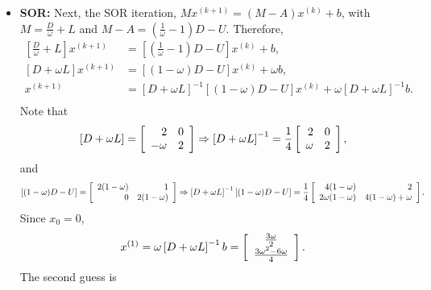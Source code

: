 \begin{questions}
\begin{solution}
\begin{itemize}
\item \textbf{SOR:}
Next, the SOR iteration, $Mx^{(k+1)}=\left(M-A\right)x^{(k)}+b$, with $M=\frac{D}{\omega}+L$ and $M-A=(\frac{1}{\omega}-1)D-U$. Therefore,
\begin{align*}
\left[\frac{D}{\omega}+L\right]x^{(k+1)}&=\left[\left(\frac{1}{\omega}-1\right)D-U\right]x^{(k)}+b,\\
\left[D+\omega L\right]x^{(k+1)}&=\left[\left(1-\omega\right)D-U\right]x^{(k)}+\omega b,\\
x^{(k+1)}&=\left[D+\omega L\right]^{-1}\left[\left(1-\omega\right)D-U\right]x^{(k)}+\omega \left[D+\omega L\right]^{-1}b.\\
\end{align*}
Note that
\begin{align*}
\left[D+\omega L\right]=\left[
	\begin{array}{r r} 
	2 & 0 \\
	-\omega & 2 \\
	\end{array} \right]\Rightarrow \left[D+\omega L\right]^{-1}=\frac{1}{4}\left[
	\begin{array}{r r} 
	2 & 0 \\
	\omega & 2 \\
	\end{array} \right],
\end{align*}
and
\begin{align*}
\left[(1-\omega)D-U\right]=\left[
	\begin{array}{r r} 
	2(1-\omega) & 1 \\
	0 & 2(1-\omega) \\
	\end{array} \right]\Rightarrow \left[D+\omega L\right]^{-1}\left[(1-\omega)D-U\right]=\frac{1}{4}\left[
	\begin{array}{r r} 
	4(1-\omega) & 2 \\
	2\omega(1-\omega) & 4(1-\omega)+\omega \\
	\end{array} \right].
\end{align*}
Since $x_0=0$,
\begin{align*}
x^{(1)}=\omega \left[D+\omega L\right]^{-1}b=\left[
	\begin{array}{c c} 
	\frac{3\omega}{2} \\
	\frac{3\omega^2-6\omega}{4} \\
	\end{array} \right].
\end{align*}
The second guess is
\begin{align*}

\end{align*}
\end{itemize}
\end{solution}
\end{questions}
